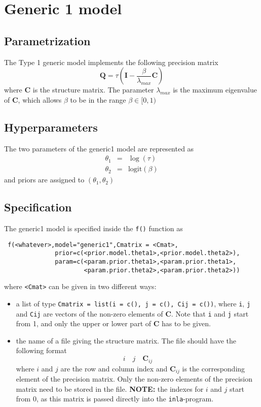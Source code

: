 \documentclass[a4paper,11pt]{article}
\begin{document}
\section*{Generic 1 model}

\subsection*{Parametrization}

The Type 1 generic model implements the following precision matrix
\[
\mathbf{Q}=\tau(\mathbf{I}-\frac{\beta}{\lambda_{max}}\mathbf{C})
\]
where $\mathbf{C}$ is the structure matrix. The parameter
$\lambda_{max}$ is the maximum eigenvalue of $\mathbf{C}$, which
allows $\beta$ to be in the range $\beta\in[0,1)$
\subsection*{Hyperparameters}

The two parameters of the generic1 model are represented as
\begin{eqnarray*}
    \theta_1 &= & \log(\tau)\\
    \theta_2 &=&\text{logit}(\beta)
\end{eqnarray*}
and priors are assigned to $(\theta_1,\theta_2)$

\subsection*{Specification}

The generic1 model is specified inside the {\tt f()} function as
\begin{verbatim}
 f(<whatever>,model="generic1",Cmatrix = <Cmat>,
              prior=c(<prior.model.theta1>,<prior.model.theta2>),
              param=c(<param.prior.theta1>,<param.prior.theta1>,
                      <param.prior.theta2>,<param.prior.theta2>))
\end{verbatim}
where {\tt <Cmat>} can be given in two different ways:
\begin{itemize}
\item a list of type {\tt Cmatrix = list(i = c(), j = c(), Cij =
        c())}, where {\tt i}, {\tt j} and {\tt Cij} are vectors of the
    non-zero elements of $\mathbf{C}$. Note that {\tt i} and {\tt j}
    start from 1, and only the upper or lower part of $\mathbf{C}$ has
    to be given.
\item the name of a file giving the structure matrix. The file should
    have the following format
    \[
    i\quad j\quad \mathbf{C}_{ij}
    \]
    where $i$ and $j$ are the row and column index and
    $\mathbf{C}_{ij}$ is the corresponding element of the precision
    matrix. Only the non-zero elements of the precision matrix need to
    be stored in the file. {\bf NOTE:} the indexes for $i$ and $j$
    start from 0, as this matrix is passed directly into the
    \texttt{inla}-program.
\end{itemize}
\end{document}
